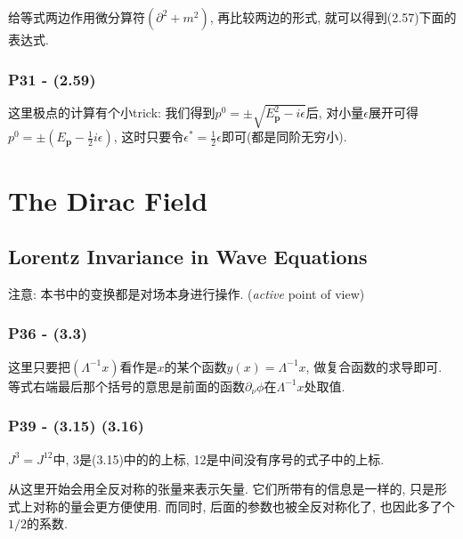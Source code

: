 \documentclass[10pt,b5paper,openany]{book}
\begin{document}
给等式两边作用微分算符$(\partial^2 + m^2)$, 再比较两边的形式, 就可以得到(2.57)下面的表达式. 

\subsection{P31 - (2.59)}

这里极点的计算有个小trick: 我们得到$p^0 = \pm\sqrt{E_\mathbf{p}^2 - i\epsilon}$后, 对小量$\epsilon$展开可得$p^0 = \pm (E_\mathbf{p} - \frac{1}{2}i\epsilon)$, 这时只要令$\epsilon^* = \frac{1}{2}\epsilon$即可(都是同阶无穷小). 

\clearpage

\chapter{The Dirac Field}

\section{Lorentz Invariance in Wave Equations}

注意: 本书中的变换都是对场本身进行操作. (\textit{active} point of view)

\subsection{P36 - (3.3)}

这里只要把$(\Lambda^{-1}x)$看作是$x$的某个函数$y(x) = \Lambda^{-1}x$, 做复合函数的求导即可. 等式右端最后那个括号的意思是前面的函数$\partial_{\nu}\phi$在$\Lambda^{-1}x$处取值. 

\subsection{P39 - (3.15) (3.16)}

$J^3 = J^{12}$中, 3是(3.15)中的的上标, 12是中间没有序号的式子中的上标. 

从这里开始会用全反对称的张量来表示矢量. 它们所带有的信息是一样的, 只是形式上对称的量会更方便使用. 而同时, 后面的参数也被全反对称化了, 也因此多了个$1/2$的系数. 

\begin{center}
\end{center}
\end{document}
